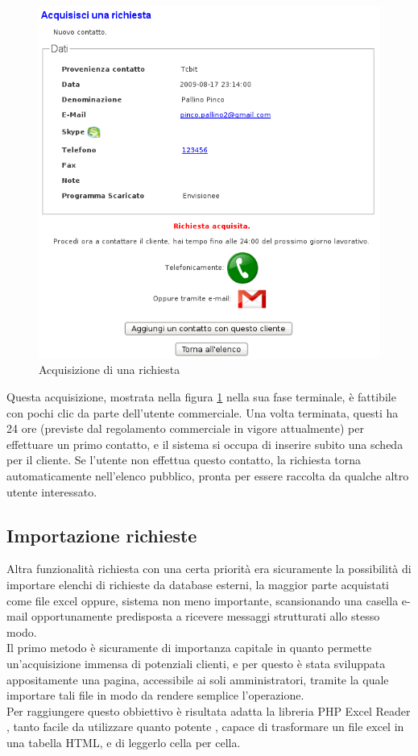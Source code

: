 \begin{figure}[!ht]
\centering
  \includegraphics[scale=0.65]{./images/acquisisciScreen.png}
\caption{Acquisizione di una richiesta}
\label{acq_richieste}
\end{figure}


\newpage
\noindent
Questa acquisizione, mostrata nella figura \ref{acq_richieste} nella sua fase terminale, \`e fattibile con pochi clic da parte dell'utente commerciale. Una volta terminata, questi ha 24 ore (previste dal regolamento commerciale in vigore attualmente) per effettuare un primo contatto, e il sistema si occupa di inserire subito una scheda per il cliente. Se l'utente non effettua questo contatto, la richiesta torna automaticamente nell'elenco pubblico, pronta per essere raccolta da qualche altro utente interessato.


\newpage
\subsection{Importazione richieste}
Altra funzionalit\`a richiesta con una certa priorit\`a era sicuramente la possibilit\`a di importare elenchi di richieste da database esterni, la maggior parte acquistati come file excel oppure, sistema non meno importante, scansionando una casella e-mail opportunamente predisposta a ricevere messaggi strutturati allo stesso modo.\\
Il primo metodo \`e sicuramente di importanza capitale in quanto permette un'acquisizione immensa di potenziali clienti, e per questo \`e stata sviluppata appositamente una pagina, accessibile ai soli amministratori, tramite la quale importare tali file in modo da rendere semplice l'operazione. \\
Per raggiungere questo obbiettivo \`e risultata adatta la libreria PHP Excel Reader \cite{excel reader}, tanto facile da utilizzare quanto potente \cite{cinque}, capace di trasformare un file excel in una tabella HTML, e di leggerlo cella per cella.

